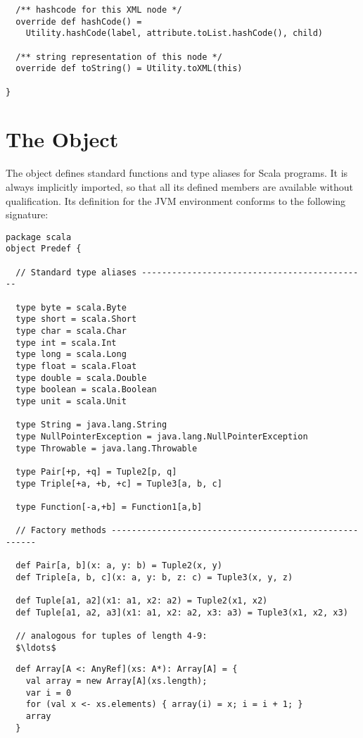 {{{\begin{lstlisting}
  /** hashcode for this XML node */
  override def hashCode() = 
    Utility.hashCode(label, attribute.toList.hashCode(), child) 

  /** string representation of this node */
  override def toString() = Utility.toXML(this) 

}
\end{lstlisting}

\newpage
\section{The \large{} Object}\label{cls:predef}

The  object defines standard functions and type aliases
for Scala programs. It is always implicitly imported, so that all its
defined members are available without qualification. Its definition
for the JVM environment conforms to the following signature:

\begin{lstlisting}
package scala
object Predef {

  // Standard type aliases ---------------------------------------------

  type byte = scala.Byte
  type short = scala.Short
  type char = scala.Char
  type int = scala.Int
  type long = scala.Long
  type float = scala.Float
  type double = scala.Double
  type boolean = scala.Boolean
  type unit = scala.Unit

  type String = java.lang.String
  type NullPointerException = java.lang.NullPointerException
  type Throwable = java.lang.Throwable

  type Pair[+p, +q] = Tuple2[p, q]
  type Triple[+a, +b, +c] = Tuple3[a, b, c]

  type Function[-a,+b] = Function1[a,b]

  // Factory methods -------------------------------------------------------

  def Pair[a, b](x: a, y: b) = Tuple2(x, y)
  def Triple[a, b, c](x: a, y: b, z: c) = Tuple3(x, y, z)

  def Tuple[a1, a2](x1: a1, x2: a2) = Tuple2(x1, x2)
  def Tuple[a1, a2, a3](x1: a1, x2: a2, x3: a3) = Tuple3(x1, x2, x3)

  // analogous for tuples of length 4-9:
  $\ldots$

\end{lstlisting}
\newpage
\begin{lstlisting}
  def Array[A <: AnyRef](xs: A*): Array[A] = {
    val array = new Array[A](xs.length);
    var i = 0
    for (val x <- xs.elements) { array(i) = x; i = i + 1; }
    array
  }


\end{lstlisting}}}}
